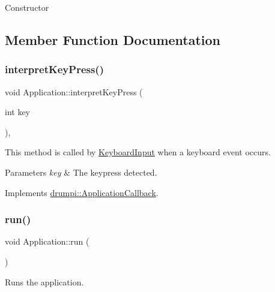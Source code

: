 Constructor 

\subsection{Member Function Documentation}
\mbox{\label{classdrumpi_1_1Application_af9f0221f37ccb5e324599554ac5ceadf}} 
\subsubsection{\texorpdfstring{interpret\+Key\+Press()}{interpretKeyPress()}}
{\footnotesize\ttfamily void Application\+::interpret\+Key\+Press (\begin{DoxyParamCaption}\item[{int}]{key }\end{DoxyParamCaption})\hspace{0.3cm}{\ttfamily [override]}, {\ttfamily [virtual]}}

This method is called by \hyperlink{classdrumpi_1_1KeyboardInput}{Keyboard\+Input} when a keyboard event occurs.


\begin{DoxyParams}{Parameters}
{\em key} & The keypress detected. \\
\hline
\end{DoxyParams}


Implements \hyperlink{classdrumpi_1_1ApplicationCallback_ab3f7606af20b435e8d2db240155c02d1}{drumpi\+::\+Application\+Callback}.

\mbox{\label{classdrumpi_1_1Application_a68965449404743bf1add056784d6cf81}} 
\subsubsection{\texorpdfstring{run()}{run()}}
{\footnotesize\ttfamily void Application\+::run (\begin{DoxyParamCaption}{ }\end{DoxyParamCaption})}



Runs the application. 

